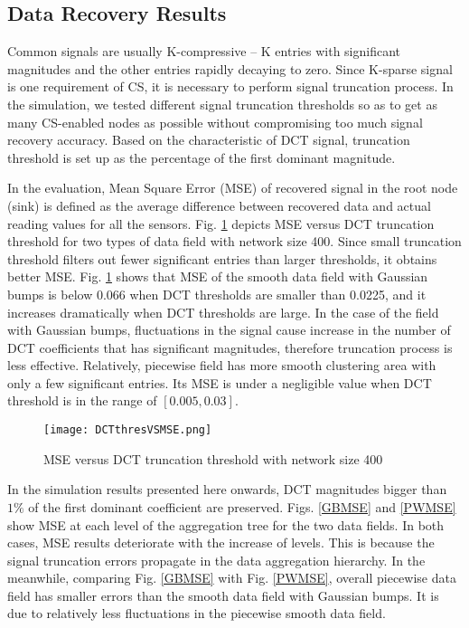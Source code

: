 \documentclass[conference]{IEEEtran}
\begin{document}
\subsection{Data Recovery Results}
Common signals are usually K-compressive -- K entries with significant magnitudes and the other entries rapidly 
decaying to zero. Since K-sparse signal is one requirement of CS, it is 
necessary to perform signal truncation process. In the simulation, we tested different 
signal truncation thresholds so as to get as many CS-enabled nodes as  
possible without compromising too much signal recovery accuracy. Based on the characteristic of DCT signal,
truncation threshold is set up as the percentage of the first dominant magnitude. 

In the evaluation, Mean Square Error (MSE) of recovered signal in the root node (sink) 
is defined as the average difference between recovered data and actual 
reading values for all the sensors. Fig. \ref{thresVSmse} depicts MSE versus DCT truncation threshold 
for two types of data field with network size 400. 
Since small truncation threshold filters out fewer significant entries than larger thresholds, it 
obtains better MSE. Fig. \ref{thresVSmse} shows that MSE of the smooth data field with Gaussian bumps is below 
0.066 when DCT thresholds are smaller than 0.0225, and it increases 
dramatically when DCT thresholds are large. In the case of the field with Gaussian bumps, fluctuations in the signal
cause increase in the number of DCT coefficients that has significant magnitudes, therefore truncation process is less effective.  
Relatively, piecewise field has more smooth clustering area with only a few significant entries. 
Its MSE is under a negligible value when DCT threshold is in the range of $[0.005, 0.03]$. 
 
\begin{figure}
  \centering
  \texttt{[image: DCTthresVSMSE.png]}
  \caption{MSE versus DCT truncation threshold with network size 400}
  \label{thresVSmse}
\end{figure}

In the simulation results presented here onwards, DCT magnitudes bigger than $1\%$ of the first dominant coefficient 
are preserved. Figs. \ref{GBMSE} and \ref{PWMSE} show MSE at each level of the aggregation tree for the two data fields. 
In both cases, MSE results deteriorate with the increase of levels. This is 
because the signal truncation errors propagate in the data aggregation hierarchy. 
In the meanwhile, comparing Fig. \ref{GBMSE} with Fig. \ref{PWMSE}, 
overall piecewise data field has smaller errors than the smooth data field with Gaussian bumps. It is 
due to relatively less fluctuations in the piecewise smooth data field. 
\end{document}
